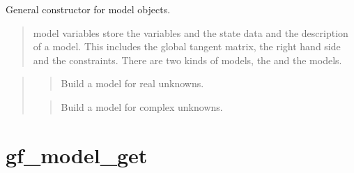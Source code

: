 \documentclass[a4paper,11pt,english]{sphinxmanual}
\begin{document}
\sphinxAtStartPar
{}

\sphinxAtStartPar
General constructor for model objects.
\begin{quote}

\sphinxAtStartPar
model variables store the variables and the state data and the
description of a model. This includes the global tangent matrix, the right
hand side and the constraints. There are two kinds of models, the 
and the  models.
\end{quote}

\sphinxAtStartPar
{}
\begin{quote}

\sphinxAtStartPar
{}
\begin{quote}

\sphinxAtStartPar
Build a model for real unknowns.
\end{quote}

\sphinxAtStartPar
{}
\begin{quote}

\sphinxAtStartPar
Build a model for complex unknowns.
\end{quote}
\end{quote}


\section{gf\_model\_get}
\label{\detokenize{matlab_octave/cmdref_gf_model_get:gf-model-get}}\label{\detokenize{matlab_octave/cmdref_gf_model_get::doc}}
\sphinxAtStartPar
{}
\end{document}
